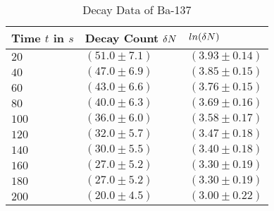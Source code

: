 \begin{table}[h!]
\centering
\begin{tabular}
{| p{3cm} | p{3cm} | p{3cm} |}
\hline
 Time $t$ in $s$ & Decay Count $\delta N$  & $ln(\delta N)$  \\ 
\hline
 $20$ & $(51.0 \pm 7.1)$ & $(3.93 \pm 0.14)$ \\ 
\hline
 $40$ & $(47.0 \pm 6.9)$ & $(3.85 \pm 0.15)$ \\ 
\hline
 $60$ & $(43.0 \pm 6.6)$ & $(3.76 \pm 0.15)$ \\ 
\hline
 $80$ & $(40.0 \pm 6.3)$ & $(3.69 \pm 0.16)$ \\ 
\hline
 $100$ & $(36.0 \pm 6.0)$ & $(3.58 \pm 0.17)$ \\ 
\hline
 $120$ & $(32.0 \pm 5.7)$ & $(3.47 \pm 0.18)$ \\ 
\hline
 $140$ & $(30.0 \pm 5.5)$ & $(3.40 \pm 0.18)$ \\ 
\hline
 $160$ & $(27.0 \pm 5.2)$ & $(3.30 \pm 0.19)$ \\ 
\hline
 $180$ & $(27.0 \pm 5.2)$ & $(3.30 \pm 0.19)$ \\ 
\hline
 $200$ & $(20.0 \pm 4.5)$ & $(3.00 \pm 0.22)$ \\ 
\hline
\end{tabular}
\label{tab:BaDecayData}
\caption{Decay Data of Ba-137}
\end{table}
